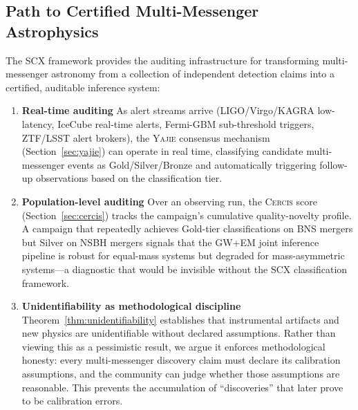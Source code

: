 \documentclass[11pt,a4paper]{article}
\theoremstyle{definition}
\newcommand{\Yajie}{\textsc{Yajie}}
\newcommand{\Cercis}{\textsc{Cercis}}
\newcommand{\SCX}{\textsc{SCX}}
\begin{document}
\subsection{Path to Certified Multi-Messenger Astrophysics}
The \SCX{} framework provides the auditing infrastructure for transforming multi-messenger astronomy from a collection of independent detection claims into a certified, auditable inference system:
\begin{enumerate}[label=(\roman*)]
    \item \textbf{Real-time auditing} As alert streams arrive (LIGO/Virgo/KAGRA low-latency, IceCube real-time alerts, Fermi-GBM sub-threshold triggers, ZTF/LSST alert brokers), the \Yajie{} consensus mechanism (Section~\ref{sec:yajie}) can operate in real time, classifying candidate multi-messenger events as Gold/Silver/Bronze and automatically triggering follow-up observations based on the classification tier.
    \item \textbf{Population-level auditing} Over an observing run, the \Cercis{} score (Section~\ref{sec:cercis}) tracks the campaign's cumulative quality-novelty profile. A campaign that repeatedly achieves Gold-tier classifications on BNS mergers but Silver on NSBH mergers signals that the GW+EM joint inference pipeline is robust for equal-mass systems but degraded for mass-asymmetric systems---a diagnostic that would be invisible without the \SCX{} classification framework.
    \item \textbf{Unidentifiability as methodological discipline} Theorem~\ref{thm:unidentifiability} establishes that instrumental artifacts and new physics are unidentifiable without declared assumptions. Rather than viewing this as a pessimistic result, we argue it enforces methodological honesty: every multi-messenger discovery claim must declare its calibration assumptions, and the community can judge whether those assumptions are reasonable. This prevents the accumulation of ``discoveries'' that later prove to be calibration errors.
\end{enumerate}
\end{document}
